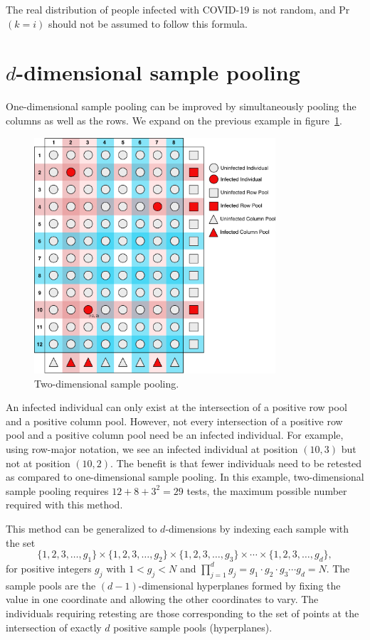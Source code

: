 \documentclass[letterpaper]{article}
\begin{document}
The real distribution of people infected with COVID-19 is not random,
and Pr$(k=i)$ should not be assumed to follow this formula.

\hypertarget{d-dimensional-sample-pooling}{%
\section{$d$-dimensional sample pooling}
\label{d-dimensional-sample-pooling}}

One-dimensional sample pooling can be improved by simultaneously pooling
the columns as well as the rows. We expand on the previous example in figure~\ref{fig2dimpooling}.


\begin{figure}
	\centering
	\includegraphics[width=0.8\textwidth]{Fig2DimPooling}
	\caption{Two-dimensional sample pooling.}
	\label{fig2dimpooling}
\end{figure}

An infected individual can only exist at the intersection of a positive
row pool and a positive column pool. However, not every intersection of
a positive row pool and a positive column pool need be an infected
individual. For example, using row-major notation, we see an infected
individual at position $(10, 3)$ but not at position $(10, 2)$. The
benefit is that fewer individuals need to be retested as compared to
one-dimensional sample pooling. In this example, two-dimensional sample
pooling requires $12+8+3^2 = 29$ tests, the maximum possible number
required with this method.

This method can be generalized to $d$-dimensions by indexing each
sample with the set
\[
\{1, 2, 3, \ldots, g_1\}\times \{1, 2, 3, \ldots, g_2\}\times \{1, 2, 3, \ldots, g_3\}\times \cdots \times \{1, 2, 3, \ldots, g_d\},
\]
for positive integers $g_j$ with $1<g_j<N$ and
$\prod_{j=1}^d g_j = g_1\cdot g_2\cdot g_3 \cdots g_d = N$.
The sample pools are the $(d-1)$-dimensional hyperplanes formed by
fixing the value in one coordinate and allowing the other coordinates to
vary. The individuals requiring retesting are those corresponding to the
set of points at the intersection of exactly $d$ positive sample pools
(hyperplanes).
\end{document}
